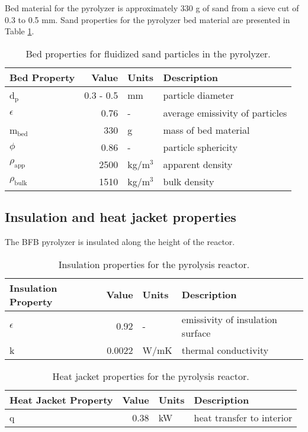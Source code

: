 Bed material for the pyrolyzer is approximately 330 g of sand from a sieve cut of 0.3 to 0.5 mm. Sand properties for the pyrolyzer bed material are presented in Table \ref{tab:sand-properties}.

\begin{table}[H]
    \centering
    \caption{Bed properties for fluidized sand particles in the pyrolyzer.}
    \label{tab:sand-properties}
    \begin{tabular}{lrll}
        \toprule
        Bed Property & Value & Units & Description \\
        \midrule
        d$_\textrm{p}$ & 0.3 - 0.5 & mm & particle diameter \\
        $\epsilon$ & 0.76 & - & average emissivity of particles \\
        m$_\textrm{bed}$ & 330 & g & mass of bed material \\
        $\phi$ & 0.86 & - & particle sphericity \\
        $\rho_\textrm{app}$ & 2500 & kg/m$^3$ & apparent density \\
        $\rho_\textrm{bulk}$ & 1510 & kg/m$^3$ & bulk density \\
        \bottomrule
    \end{tabular}
\end{table}

\subsection{Insulation and heat jacket properties}

The BFB pyrolyzer is insulated along the height of the reactor.

\begin{table}[H]
    \centering
    \caption{Insulation properties for the pyrolysis reactor.}
    \label{tab:insulation}
    \begin{tabular}{lrll}
        \toprule
        Insulation Property & Value & Units & Description \\
        \midrule
        $\epsilon$ & 0.92 & - & emissivity of insulation surface \\
        k & 0.0022 & W/mK & thermal conductivity \\
        \bottomrule
    \end{tabular}
\end{table}

\begin{table}[H]
    \centering
    \caption{Heat jacket properties for the pyrolysis reactor.}
    \label{tab:heatjacket}
    \begin{tabular}{lrll}
        \toprule
        Heat Jacket Property & Value & Units & Description \\
        \midrule
        q & 0.38 & kW & heat transfer to interior \\
        \bottomrule
    \end{tabular}
\end{table}

